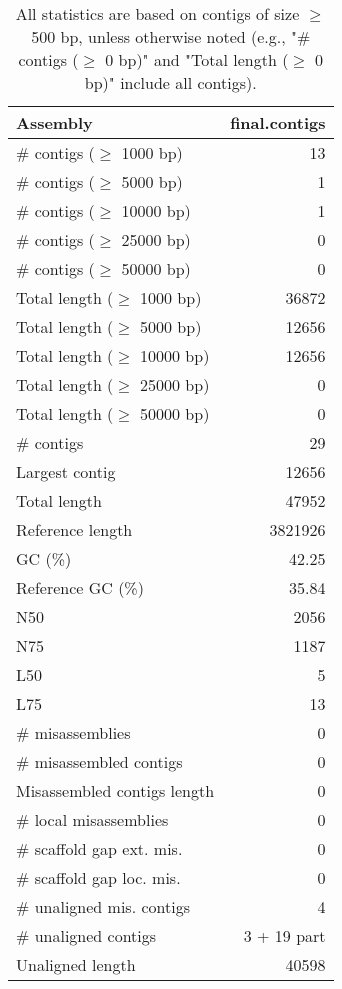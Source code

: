 \documentclass[12pt,a4paper]{article}
\begin{document}
\begin{table}[ht]
\begin{center}
\caption{All statistics are based on contigs of size $\geq$ 500 bp, unless otherwise noted (e.g., "\# contigs ($\geq$ 0 bp)" and "Total length ($\geq$ 0 bp)" include all contigs).}
\begin{tabular}{|l*{1}{|r}|}
\hline
Assembly & final.contigs \\ \hline
\# contigs ($\geq$ 1000 bp) & 13 \\ \hline
\# contigs ($\geq$ 5000 bp) & 1 \\ \hline
\# contigs ($\geq$ 10000 bp) & 1 \\ \hline
\# contigs ($\geq$ 25000 bp) & 0 \\ \hline
\# contigs ($\geq$ 50000 bp) & 0 \\ \hline
Total length ($\geq$ 1000 bp) & 36872 \\ \hline
Total length ($\geq$ 5000 bp) & 12656 \\ \hline
Total length ($\geq$ 10000 bp) & 12656 \\ \hline
Total length ($\geq$ 25000 bp) & 0 \\ \hline
Total length ($\geq$ 50000 bp) & 0 \\ \hline
\# contigs & 29 \\ \hline
Largest contig & 12656 \\ \hline
Total length & 47952 \\ \hline
Reference length & 3821926 \\ \hline
GC (\%) & 42.25 \\ \hline
Reference GC (\%) & 35.84 \\ \hline
N50 & 2056 \\ \hline
N75 & 1187 \\ \hline
L50 & 5 \\ \hline
L75 & 13 \\ \hline
\# misassemblies & 0 \\ \hline
\# misassembled contigs & 0 \\ \hline
Misassembled contigs length & 0 \\ \hline
\# local misassemblies & 0 \\ \hline
\# scaffold gap ext. mis. & 0 \\ \hline
\# scaffold gap loc. mis. & 0 \\ \hline
\# unaligned mis. contigs & 4 \\ \hline
\# unaligned contigs & 3 + 19 part \\ \hline
Unaligned length & 40598 \\ \hline

\end{tabular}
\end{center}
\end{table}
\end{document}
